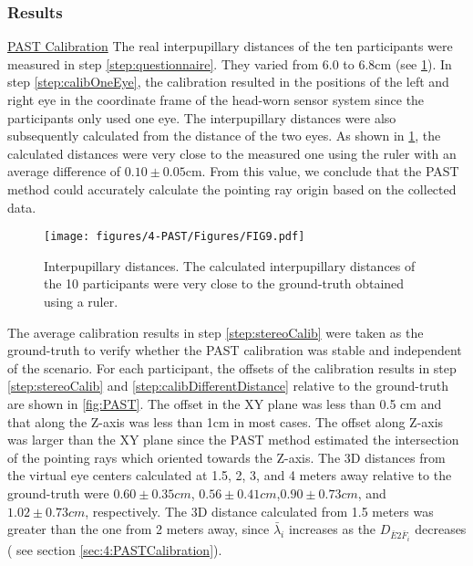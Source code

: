 \subsubsection{Results} \label{sec:4:results}
\underline{PAST Calibration} The real interpupillary distances of the ten participants were measured in step \ref{step:questionnaire}. They varied from 6.0 to 6.8cm (see \figurename{ \ref{fig:InterpupillaryDist}}). In step \ref{step:calibOneEye}, the calibration resulted in the positions of the left and right eye in the coordinate frame of the head-worn sensor system since the participants only used one eye. The interpupillary distances were also subsequently calculated from the distance of the two eyes. As shown in \figurename{ \ref{fig:InterpupillaryDist}}, the calculated distances were very close to the measured one using the ruler with an average difference of $0.10\pm0.05$cm. From this value, we conclude that the PAST method could accurately calculate the pointing ray origin based on the collected data. 
\begin{figure} 
	\centering
	\texttt{[image: figures/4-PAST/Figures/FIG9.pdf]}
	\caption{Interpupillary distances. The calculated interpupillary distances of the 10 participants were very close to the ground-truth obtained using a ruler.}
	\label{fig:InterpupillaryDist}
\end{figure}
The average calibration results in step \ref{step:stereoCalib} were taken as the ground-truth to verify whether the PAST calibration was stable and independent of the scenario. 
For each participant, the offsets of the calibration results in step \ref{step:stereoCalib} and \ref{step:calibDifferentDistance} relative to the ground-truth are shown in \figurename{ \ref{fig:PAST}}.
The offset in the XY plane was less than 0.5 cm and that along the Z-axis was less than 1cm in most cases. The offset along Z-axis was larger than the XY plane since the PAST method estimated the intersection of the pointing rays which oriented towards the Z-axis. %
The 3D distances from the virtual eye centers calculated at 1.5, 2, 3, and 4 meters away relative to the ground-truth were $0.60\pm0.35cm$, $0.56\pm0.41cm$,$0.90\pm0.73cm$, and $1.02\pm0.73cm$, respectively. 
The 3D distance calculated from 1.5 meters was greater than the one from 2 meters away, since $\bar\lambda_i$ increases as the $ D_{\bar E2 \bar F_i}$ decreases ( see section \ref{sec:4:PASTCalibration}).  
